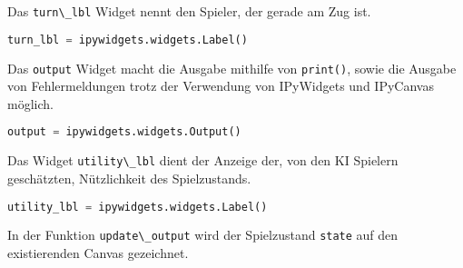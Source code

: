 Das \passthrough{\lstinline!turn\_lbl!} Widget nennt den Spieler, der
gerade am Zug ist.

\begin{lstlisting}[language=Python]
turn_lbl = ipywidgets.widgets.Label()
\end{lstlisting}

Das \passthrough{\lstinline!output!} Widget macht die Ausgabe mithilfe
von \passthrough{\lstinline!print()!}, sowie die Ausgabe von
Fehlermeldungen trotz der Verwendung von IPyWidgets und IPyCanvas
möglich.

\begin{lstlisting}[language=Python]
output = ipywidgets.widgets.Output()
\end{lstlisting}

Das Widget \passthrough{\lstinline!utility\_lbl!} dient der Anzeige der,
von den KI Spielern geschätzten, Nützlichkeit des Spielzustands.

\begin{lstlisting}[language=Python]
utility_lbl = ipywidgets.widgets.Label()
\end{lstlisting}

In der Funktion \passthrough{\lstinline!update\_output!} wird der
Spielzustand \passthrough{\lstinline!state!} auf den existierenden
Canvas gezeichnet.

